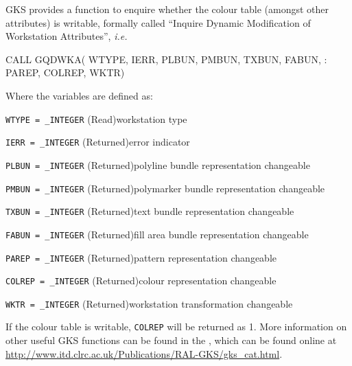 \documentclass[twoside,11pt]{starlink}
\begin{document}
GKS provides a function to enquire whether the colour table (amongst
other attributes) is writable, formally called ``Inquire Dynamic
Modification of Workstation Attributes'', \emph{i.e.\ }

\begin{small}
\begin{terminalv}
      CALL GQDWKA( WTYPE, IERR, PLBUN, PMBUN, TXBUN, FABUN,
     :             PAREP, COLREP, WKTR)
\end{terminalv}
\end{small}

Where the variables are defined as:

\begin{description}
\item \texttt{WTYPE = \_INTEGER} (Read)\newline workstation type
\item \texttt{IERR = \_INTEGER} (Returned)\newline error indicator
\item \texttt{PLBUN = \_INTEGER} (Returned)\newline polyline bundle representation changeable
\item \texttt{PMBUN = \_INTEGER} (Returned)\newline polymarker bundle representation changeable
\item \texttt{TXBUN = \_INTEGER} (Returned)\newline text bundle representation changeable
\item \texttt{FABUN = \_INTEGER} (Returned)\newline fill area bundle representation changeable
\item \texttt{PAREP = \_INTEGER} (Returned)\newline pattern representation changeable
\item \texttt{COLREP = \_INTEGER} (Returned)\newline colour representation changeable
\item \texttt{WKTR = \_INTEGER} (Returned)\newline workstation transformation changeable
\end{description}

If the colour table is writable, \texttt{COLREP} will be returned as 1.
More information on other useful GKS functions can be found in the
,
which can be found online at \url{http://www.itd.clrc.ac.uk/Publications/RAL-GKS/gks_cat.html}.
\end{document}
